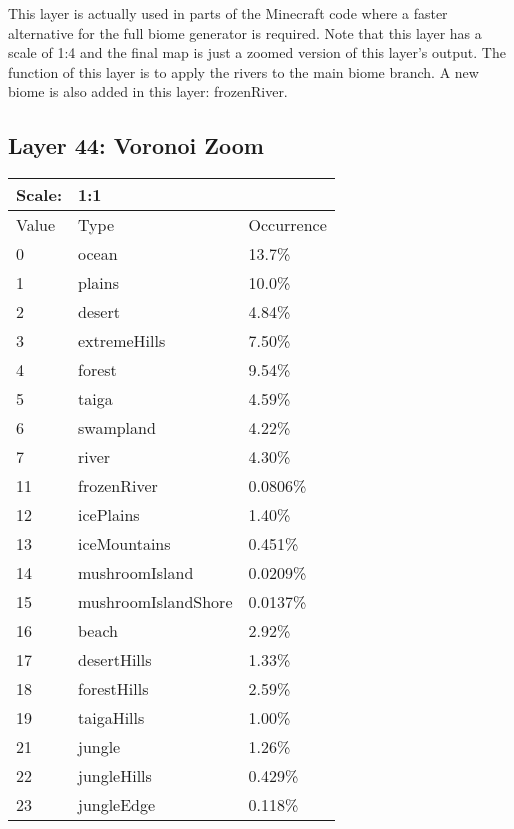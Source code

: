 \documentclass{article}
\begin{document}
	\medskip\noindent
	This layer is actually used in parts of the Minecraft code where a faster alternative for the full biome generator is required. Note that this layer has a scale of 1:4 and the final map is just a zoomed version of this layer's output. The function of this layer is to apply the rivers to the main biome branch. A new biome is also added in this layer: frozenRiver.
	

	\subsection{Layer 44: Voronoi Zoom}
	\begin{tabular}{|l|l|l|}\hline
		Scale: & \multicolumn{2}{|l|}{1:1} \\\hline\hline
		Value  & Type                & Occurrence \\\hline
		0      & ocean               & 13.7\%\\\hline
		1      & plains              & 10.0\%\\\hline
		2      & desert              & 4.84\%\\\hline
		3      & extremeHills        & 7.50\%\\\hline
		4      & forest              & 9.54\%\\\hline
		5      & taiga               & 4.59\%\\\hline
		6      & swampland           & 4.22\%\\\hline
		7      & river               & 4.30\%\\\hline
		11     & frozenRiver         & 0.0806\%\\\hline
		12     & icePlains           & 1.40\%\\\hline
		13     & iceMountains        & 0.451\%\\\hline
		14     & mushroomIsland      & 0.0209\%\\\hline
		15     & mushroomIslandShore & 0.0137\%\\\hline
		16     & beach               & 2.92\%\\\hline
		17     & desertHills         & 1.33\%\\\hline
		18     & forestHills         & 2.59\%\\\hline
		19     & taigaHills          & 1.00\%\\\hline
		21     & jungle              & 1.26\%\\\hline
		22     & jungleHills         & 0.429\%\\\hline
		23     & jungleEdge          & 0.118\%\\\hline

\end{tabular}
\end{document}
